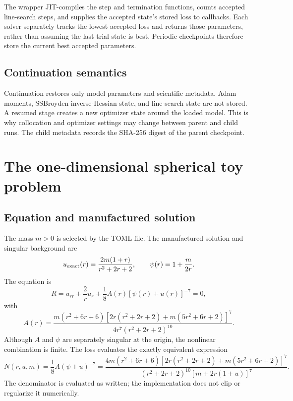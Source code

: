 \documentclass[11pt]{article}
\begin{document}
The wrapper JIT-compiles the step and termination functions, counts accepted
line-search steps, and supplies the accepted state's stored loss to callbacks.
Each solver separately tracks the lowest accepted loss and returns those
parameters, rather than assuming the last trial state is best.  Periodic
checkpoints therefore store the current best accepted parameters.

\subsection{Continuation semantics}

Continuation restores only model parameters and scientific metadata.  Adam
moments, SSBroyden inverse-Hessian state, and line-search state are not stored.
A resumed stage creates a new optimizer state around the loaded model.  This
is why collocation and optimizer settings may change between parent and child
runs.  The child metadata records the SHA-256 digest of the parent checkpoint.

\section{The one-dimensional spherical toy problem}

\subsection{Equation and manufactured solution}

The mass $m>0$ is selected by the TOML file.  The manufactured solution and
singular background are
\begin{equation}
 u_{\rm exact}(r)=\frac{2m(1+r)}{r^2+2r+2},
 \qquad
 \psi(r)=1+\frac{m}{2r}.
 \label{eq:toy-exact}
\end{equation}
The equation is
\begin{equation}
 R=u_{rr}+\frac{2}{r}u_r+
 \frac{1}{8}A(r)[\psi(r)+u(r)]^{-7}=0,
 \label{eq:toy-pde}
\end{equation}
with
\begin{equation}
 A(r)=
 \frac{m(r^2+6r+6)
 [2r(r^2+2r+2)+m(5r^2+6r+2)]^7}
 {4r^7(r^2+2r+2)^{10}}.
\end{equation}
Although $A$ and $\psi$ are separately singular at the origin, the nonlinear
combination is finite.  The loss evaluates the exactly equivalent expression
\begin{equation}
 N(r,u,m)=\frac{1}{8}A(\psi+u)^{-7}
 =\frac{4m(r^2+6r+6)
 [2r(r^2+2r+2)+m(5r^2+6r+2)]^7}
 {(r^2+2r+2)^{10}[m+2r(1+u)]^7}.
 \label{eq:toy-stable-source}
\end{equation}
The denominator is evaluated as written; the implementation does not clip or
regularize it numerically.
\end{document}
